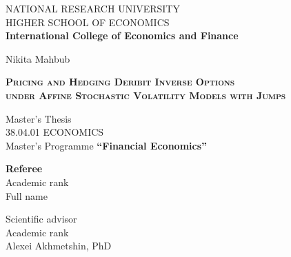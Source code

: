 \documentclass[a4paper,titlepage,12pt]{report}
\theoremstyle{plain}
\begin{document}
\pagestyle{empty}

\vspace*{2cm}

\begin{center}
{NATIONAL RESEARCH UNIVERSITY\\HIGHER SCHOOL OF ECONOMICS\\{\textbf{{International College of Economics and Finance}}}}
\end{center}
\newcommand\fypcode{SCSE8338}


\vspace*{1cm}

\begin{center}

{Nikita Mahbub}

\end{center}


\begin{center}
\large
{\textsc{\textbf{Pricing and Hedging Deribit Inverse Options\\under Affine Stochastic Volatility Models with Jumps}}}
\end{center}


\begin{center}

{{Master's Thesis\\
38.04.01 ECONOMICS\\ Master's Programme \textbf{``Financial Economics''}}}
\end{center}

\vspace*{2cm}

\noindent
\begin{minipage}[t]{0.45\textwidth}
\textbf{Referee}\\
Academic rank\\
Full name
\end{minipage}
\hfill
\begin{minipage}[t]{0.45\textwidth}
\raggedleft
Scientific advisor\\
Academic rank\\
Alexei Akhmetshin, PhD
\end{minipage}



\end{document}

